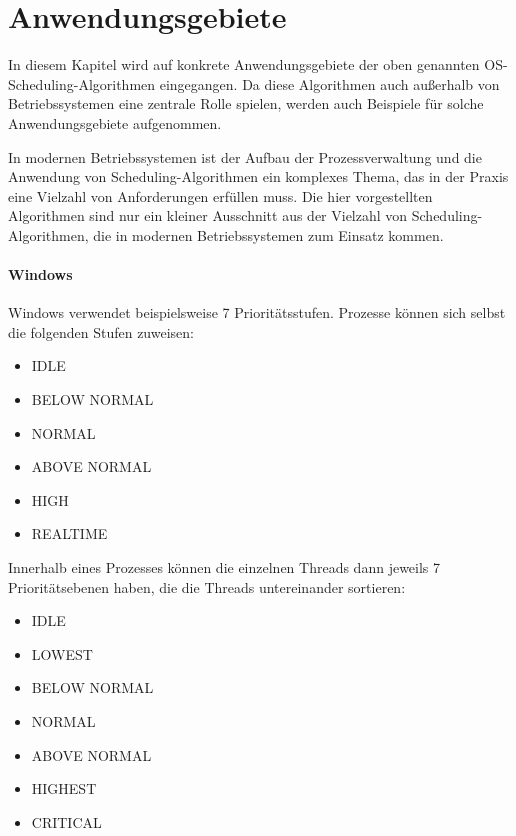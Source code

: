 \chapter{Anwendungsgebiete}
In diesem Kapitel wird auf konkrete Anwendungsgebiete der oben genannten OS-Scheduling-Algorithmen eingegangen. Da diese Algorithmen auch außerhalb von Betriebssystemen eine zentrale Rolle spielen, werden auch Beispiele für solche Anwendungsgebiete aufgenommen.

In modernen Betriebssystemen ist der Aufbau der Prozessverwaltung und die Anwendung von Scheduling-Algorithmen ein komplexes Thema, das in der Praxis eine Vielzahl von Anforderungen erfüllen muss. Die hier vorgestellten Algorithmen sind nur ein kleiner Ausschnitt aus der Vielzahl von Scheduling-Algorithmen, die in modernen Betriebssystemen zum Einsatz kommen.

\subsubsection{Windows}
Windows verwendet beispielsweise 7 Prioritätsstufen.
Prozesse können sich selbst die folgenden Stufen zuweisen:
\begin{multicols}{3}
    \begin{itemize}[noitemsep]
        \item IDLE
        \item BELOW NORMAL
        \item NORMAL
        \item ABOVE NORMAL
        \item HIGH
        \item REALTIME
    \end{itemize}
\end{multicols}

Innerhalb eines Prozesses können die einzelnen Threads dann jeweils 7 Prioritätsebenen haben, die die Threads untereinander sortieren:
\begin{multicols}{3}
    \begin{itemize}[noitemsep]
        \item IDLE
        \item LOWEST
        \item BELOW NORMAL
        \item NORMAL
        \item ABOVE NORMAL
        \item HIGHEST
        \item CRITICAL
    \end{itemize}
\end{multicols}

